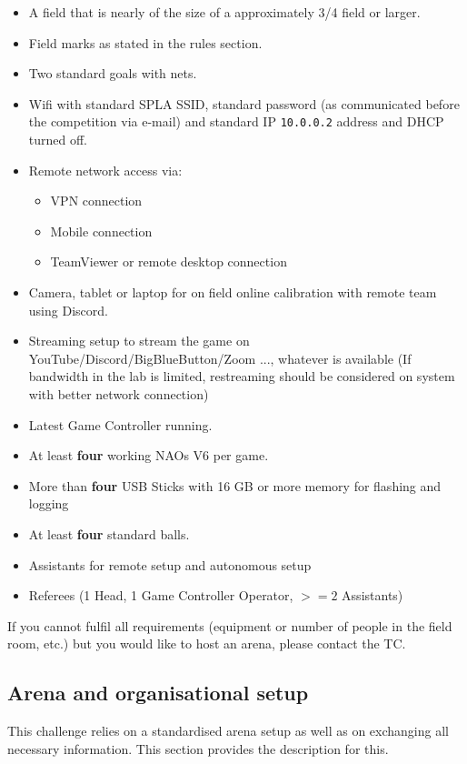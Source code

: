 \begin{itemize}
    \item A field that is nearly of the size of a approximately 3/4 field or larger.
    \item Field marks as stated in the rules section. 
    \item Two standard goals with nets.
	\item Wifi with standard SPL\textunderscore A SSID, standard password (as communicated before the competition via e-mail) and standard IP \texttt{10.0.0.2} address and DHCP turned off.
    \item Remote network access via:
    \begin{itemize}
        \item VPN connection
        \item Mobile connection
        \item TeamViewer or remote desktop connection
    \end{itemize}
    \item Camera, tablet or laptop for on field online calibration with remote team using Discord.
    \item Streaming setup to stream the game on YouTube/Discord/BigBlueButton/Zoom ..., whatever is available (If bandwidth in the lab is limited, restreaming should be considered on system with better network connection)
    \label{streaming_explained}
	\item Latest Game Controller running.
    \item At least \textbf{four} working NAOs V6 per game.
    \item More than \textbf{four} USB Sticks with 16 GB or more memory for flashing and logging 
    \item At least \textbf{four} standard balls.
    \item Assistants for remote setup and autonomous setup
    \item Referees (1 Head, 1 Game Controller Operator, $>= 2$ Assistants)
\end{itemize}

If you cannot fulfil all requirements (equipment or number of people in the field room, etc.) but you would like to host an arena, please contact the TC.

\subsection{Arena and organisational setup}
This challenge relies on a standardised arena setup as well as on exchanging all necessary information. This section provides the description for this.

